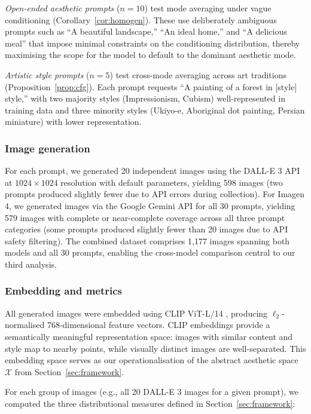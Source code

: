 \documentclass[11pt]{article}
\begin{document}
\textit{Open-ended aesthetic prompts} ($n = 10$) test mode averaging under vague conditioning (Corollary~\ref{cor:homogen}). These use deliberately ambiguous prompts such as ``A beautiful landscape,'' ``An ideal home,'' and ``A delicious meal'' that impose minimal constraints on the conditioning distribution, thereby maximising the scope for the model to default to the dominant aesthetic mode.

\textit{Artistic style prompts} ($n = 5$) test cross-mode averaging across art traditions (Proposition~\ref{prop:cfg}). Each prompt requests ``A painting of a forest in [style] style,'' with two majority styles (Impressionism, Cubism) well-represented in training data and three minority styles (Ukiyo-e, Aboriginal dot painting, Persian miniature) with lower representation.

\subsubsection{Image generation}

For each prompt, we generated 20 independent images using the DALL-E 3 API at $1024 \times 1024$ resolution with default parameters, yielding 598 images (two prompts produced slightly fewer due to API errors during collection). For Imagen 4, we generated images via the Google Gemini API for all 30 prompts, yielding 579 images with complete or near-complete coverage across all three prompt categories (some prompts produced slightly fewer than 20 images due to API safety filtering). The combined dataset comprises 1{,}177 images spanning both models and all 30 prompts, enabling the cross-model comparison central to our third analysis.

\subsubsection{Embedding and metrics}

All generated images were embedded using CLIP ViT-L/14 \citep{Radford2021}, producing $\ell_2$-normalised 768-dimensional feature vectors. CLIP embeddings provide a semantically meaningful representation space: images with similar content and style map to nearby points, while visually distinct images are well-separated. This embedding space serves as our operationalisation of the abstract aesthetic space $\mathcal{X}$ from Section~\ref{sec:framework}.

For each group of images (e.g., all 20 DALL-E 3 images for a given prompt), we computed the three distributional measures defined in Section~\ref{sec:framework}:
\end{document}
